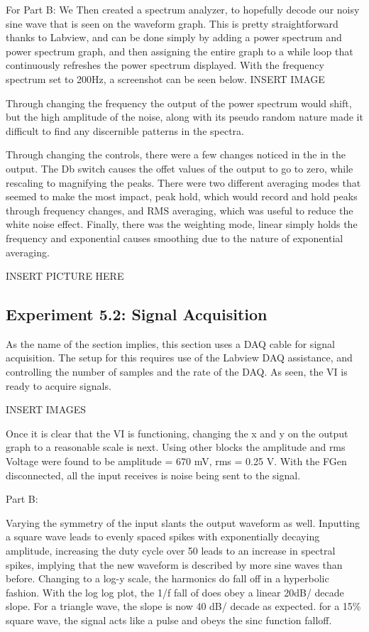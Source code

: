 \documentclass[10pt]{article}
\begin{document}
For Part B: We Then created a spectrum analyzer, to hopefully decode our noisy sine wave that is seen on the waveform graph. This is pretty straightforward thanks to Labview, and can be done simply by adding a power spectrum and power spectrum graph, and then assigning the entire graph to a while loop that continuously refreshes the power spectrum displayed. With the frequency spectrum set to 200Hz, a screenshot can be seen below.
INSERT IMAGE

Through changing the frequency the output of the power spectrum would shift, but the high amplitude of the noise, along with its pseudo random nature made it difficult to find any discernible patterns in the spectra.

Through changing the controls, there were a few changes noticed in the in the output. The Db switch causes the offet values of the output to go to zero, while rescaling to magnifying the peaks. There were two different averaging modes that seemed to make the most impact, peak hold, which would record and hold peaks through frequency changes, and RMS averaging, which was useful to reduce the white noise effect. Finally, there was the weighting mode, linear simply holds the frequency and exponential causes smoothing due to the nature of exponential averaging.

INSERT PICTURE HERE

\subsection{Experiment 5.2: Signal Acquisition}

As the name of the section implies, this section uses a DAQ cable for signal acquisition. The setup for this requires use of the Labview DAQ assistance, and controlling the number of samples and the rate of the DAQ. As seen, the VI is ready to acquire signals.

INSERT IMAGES

Once it is clear that the VI is functioning, changing the x and y on the output graph to a reasonable scale is next. Using other blocks the amplitude and rms Voltage were found to be amplitude = 670 mV, rms = 0.25 V. With the FGen disconnected, all the input receives is noise being sent to the signal.

Part B:

Varying the symmetry of the input slants the output waveform as well. Inputting a square wave leads to evenly spaced spikes with exponentially decaying amplitude, increasing the duty cycle over 50 leads to an increase in spectral spikes, implying that the new waveform is described by more sine waves than before. Changing to a log-y scale, the harmonics do fall off in a hyperbolic fashion. With the log log plot, the 1/f fall of does obey a linear 20dB/ decade slope. For a triangle wave, the slope is now 40 dB/ decade as expected. for a 15\% square wave, the signal acts like a pulse and obeys the sinc function falloff. 
\end{document}
